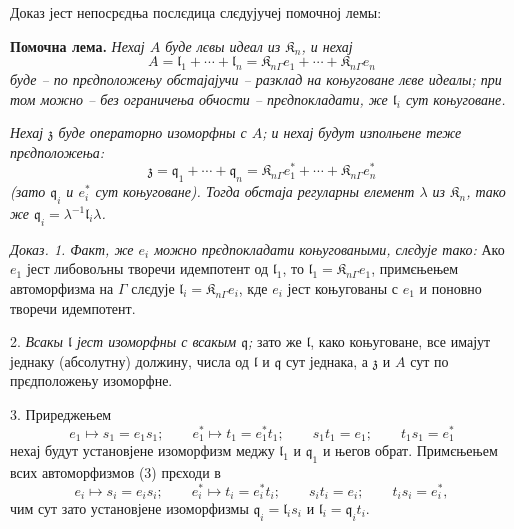 \documentclass[11pt]{article}
\begin{document}
Доказ јест непосрєдња послєдица слєдујучеј помочној лемы:

\textbf{Помочна лема.} \emph{Нехај \(A\) буде лєвы идеал из \(\mathfrak K_n\), и нехај}
\[
A=\mathfrak l_1+\cdots+\mathfrak l_n
=\mathfrak K_{n\Gamma}e_1+\cdots+\mathfrak K_{n\Gamma}e_n
\]
\emph{буде -- по прєдположењу обстајајучи -- разклад на коњуговане лєве идеалы; при том можно -- без ограничења обчости -- прєдпокладати, же \(\mathfrak l_i\) сут коњуговане.}

\emph{Нехај \(\mathfrak z\) буде операторно изоморфны с \(A\); и нехај будут изполњене теже прєдположења:}
\[
\mathfrak z=\mathfrak q_1+\cdots+\mathfrak q_n
=\mathfrak K_{n\Gamma}e_1^*+\cdots+\mathfrak K_{n\Gamma}e_n^*
\]
\emph{(зато \(\mathfrak q_i\) и \(e_i^*\) сут коњуговане). Тогда обстаја регуларны елемент \(\lambda\) из \(\mathfrak K_n\), тако же \(\mathfrak q_i=\lambda^{-1}\mathfrak l_i\lambda\).}

\emph{Доказ. 1. Факт, же \(e_i\) можно прєдпокладати коњуговаными, слєдује тако:} Ако \(e_1\) јест либовољны творечи идемпотент од \(\mathfrak l_1\), то \(\mathfrak l_1=\mathfrak K_{n\Gamma}e_1\), примєњењем автоморфизма на \(\Gamma\) слєдује \(\mathfrak l_i=\mathfrak K_{n\Gamma}e_i\), кде \(e_i\) јест коњугованы с \(e_1\) и поновно творечи идемпотент.

2. \emph{Всакы \(\mathfrak l\) јест изоморфны с всакым \(\mathfrak q\);} зато же \(\mathfrak l\), како коњуговане, все имајут једнаку (абсолутну) должину, числа од \(\mathfrak l\) и \(\mathfrak q\) сут једнака, а \(\mathfrak z\) и \(A\) сут по прєдположењу изоморфне.

3. Приреджењем
\[
\tag{3}
e_1\mapsto s_1=e_1s_1;\qquad
e_1^*\mapsto t_1=e_1^*t_1;\qquad
s_1t_1=e_1;\qquad
t_1s_1=e_1^*
\]
нехај будут установјене изоморфизм меджу \(\mathfrak l_1\) и \(\mathfrak q_1\) и његов обрат. Примєњењем всих автоморфизмов (3) прєходи в
\[
e_i\mapsto s_i=e_is_i;\qquad
e_i^*\mapsto t_i=e_i^*t_i;\qquad
s_it_i=e_i;\qquad
t_is_i=e_i^*,
\]
чим сут зато установјене изоморфизмы \(\mathfrak q_i=\mathfrak l_is_i\) и \(\mathfrak l_i=\mathfrak q_it_i\).
\end{document}
